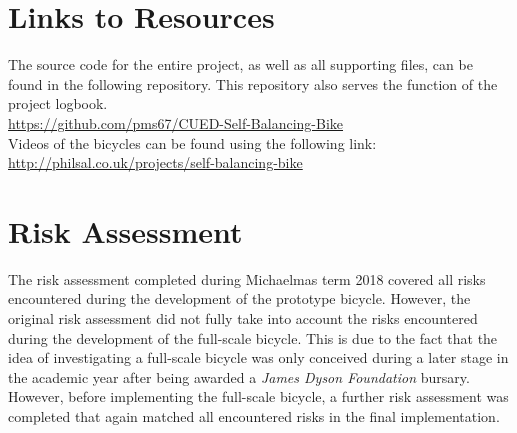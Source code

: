 \begin{appendices}
\section{Links to Resources}
The source code for the entire project, as well as all supporting files, can be found in the following repository. This repository also serves the function of the project logbook. \\

\url{https://github.com/pms67/CUED-Self-Balancing-Bike} \\

Videos of the bicycles can be found using the following link: \\

\url{http://philsal.co.uk/projects/self-balancing-bike}

\section{Risk Assessment}
The risk assessment completed during Michaelmas term 2018 covered all risks encountered during the development of the prototype bicycle. However, the original risk assessment did not fully take into account the risks encountered during the development of the full-scale bicycle. This is due to the fact that the idea of investigating a full-scale bicycle was only conceived during a later stage in the academic year after being awarded a \textit{James Dyson Foundation} bursary. However, before implementing the full-scale bicycle, a further risk assessment was completed that again matched all encountered risks in the final implementation.
\end{appendices}